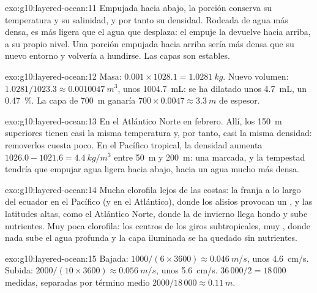 \begin{solution}{exo:g10:layered-ocean:11}
Empujada hacia abajo, la porción conserva su temperatura y su salinidad, y
por tanto su densidad. Rodeada de agua más densa, es más ligera que el agua
que desplaza: el empuje la devuelve hacia arriba, a su propio nivel. Una
porción empujada hacia arriba sería más densa que su nuevo entorno y volvería
a hundirse. Las capas son estables.
\end{solution}

\begin{solution}{exo:g10:layered-ocean:12}
Masa: $0.001 \times 1028.1 = \qty{1.0281}{kg}$. Nuevo volumen: $1.0281/1023.3
\approx \qty{0.0010047}{m^3}$, unos \qty{1004.7}{mL}: se ha dilatado unos
\qty{4.7}{mL}, un \qty{0.47}{\percent}. La capa de \qty{700}{m} ganaría
$700 \times 0.0047 \approx \qty{3.3}{m}$ de espesor.
\end{solution}

\begin{solution}{exo:g10:layered-ocean:13}
En el Atlántico Norte en febrero. Allí, los \qty{150}{m} superiores tienen
casi la misma temperatura y, por tanto, casi la misma densidad: removerlos
cuesta poco. En el Pacífico tropical, la densidad aumenta $1026.0 - 1021.6 =
\qty{4.4}{kg/m^3}$ entre \qty{50}{m} y \qty{200}{m}: una  marcada,
y la tempestad tendría que empujar agua ligera hacia abajo, hacia un agua
mucho más densa.
\end{solution}

\begin{solution}{exo:g10:layered-ocean:14}
Mucha clorofila lejos de las costas: la franja a lo largo del ecuador en el
Pacífico (y en el Atlántico), donde los alisios provocan un , y
las latitudes altas, como el Atlántico Norte, donde la  de
invierno llega hondo y sube nutrientes. Muy poca clorofila: los centros de
los giros subtropicales, muy , donde nada sube el agua
profunda y la capa iluminada se ha quedado sin nutrientes.
\end{solution}

\begin{solution}{exo:g10:layered-ocean:15}
Bajada: $1000/(6 \times 3600) \approx \qty{0.046}{m/s}$, unos
\qty{4.6}{cm/s}. Subida: $2000/(10 \times 3600) \approx \qty{0.056}{m/s}$,
unos \qty{5.6}{cm/s}. $36\,000/2 = 18\,000$ medidas, separadas por término
medio $2000/18\,000 \approx \qty{0.11}{m}$.
\end{solution}

